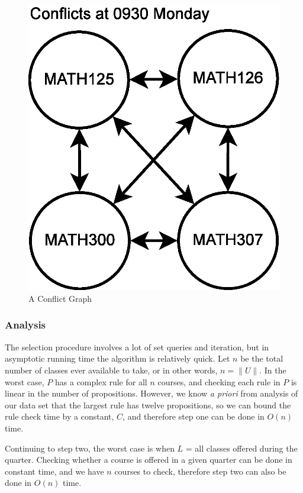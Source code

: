 \documentclass[11pt]{article} %
\begin{document}
\begin{figure} [ht]
    \begin{center}
        \includegraphics[scale=0.35]{conflict_graph_ex}
    \end{center}
    \caption{A Conflict Graph}
    \label{conflictg}
\end{figure}

\subsubsection{Analysis} The selection procedure involves a lot of set queries
and iteration, but in asymptotic running time the algorithm is relatively quick.
Let $n$ be the total number of classes ever available to take, or in other
words, $n = \|U\|$. In the worst case, $P$ has a complex rule for all $n$
courses, and checking each rule in $P$ is linear in the number of propositions.
However, we know {\it a priori} from analysis of our data set that the largest
rule has twelve propositions, so we can bound the rule check time by a constant,
$C$, and therefore step one can be done in $O(n)$ time.

Continuing to step two, the worst case is when $L$ = {all classes offered during
the quarter}.  Checking whether a course is offered in a given quarter can be
done in constant time, and we have $n$ courses to check, therefore step two can
also be done in $O(n)$ time.
\end{document}
